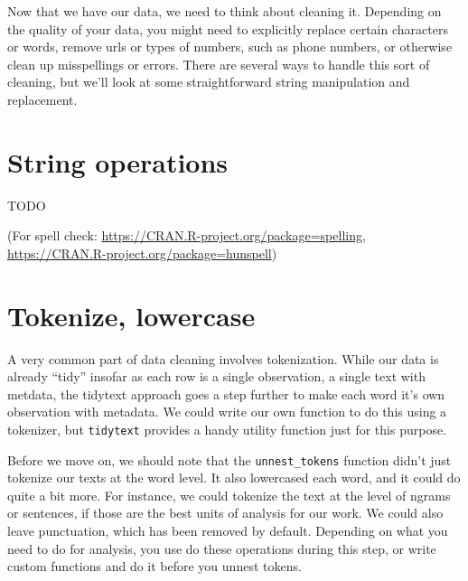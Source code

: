 \documentclass[]{book}
\newenvironment{Shaded}{\begin{snugshade}}{\end{snugshade}}
\newcommand{\KeywordTok}[1]{\textcolor[rgb]{0.13,0.29,0.53}{\textbf{#1}}}
\newcommand{\NormalTok}[1]{#1}
\newcommand{\OperatorTok}[1]{\textcolor[rgb]{0.81,0.36,0.00}{\textbf{#1}}}
\newcommand{\StringTok}[1]{\textcolor[rgb]{0.31,0.60,0.02}{#1}}
\begin{document}
Now that we have our data, we need to think about cleaning it. Depending on the quality of your data, you might need to explicitly replace certain characters or words, remove urls or types of numbers, such as phone numbers, or otherwise clean up misspellings or errors. There are several ways to handle this sort of cleaning, but we'll look at some straightforward string manipulation and replacement.

\hypertarget{string-operations}{%
\section{String operations}\label{string-operations}}

TODO

(For spell check: \url{https://CRAN.R-project.org/package=spelling}, \url{https://CRAN.R-project.org/package=hunspell})

\hypertarget{tokenize-lowercase}{%
\section{Tokenize, lowercase}\label{tokenize-lowercase}}

A very common part of data cleaning involves tokenization. While our data is already ``tidy'' insofar as each row is a single observation, a single text with metdata, the tidytext approach goes a step further to make each word it's own observation with metadata. We could write our own function to do this using a tokenizer, but \texttt{tidytext} provides a handy utility function just for this purpose.

\begin{Shaded}
\end{Shaded}

Before we move on, we should note that the \texttt{unnest\_tokens} function didn't just tokenize our texts at the word level. It also lowercased each word, and it could do quite a bit more. For instance, we could tokenize the text at the level of ngrams or sentences, if those are the best units of analysis for our work. We could also leave punctuation, which has been removed by default. Depending on what you need to do for analysis, you use do these operations during this step, or write custom functions and do it before you unnest tokens.
\end{document}
